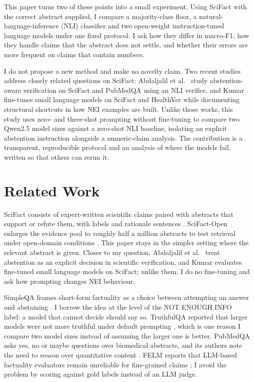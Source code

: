 \documentclass[conference]{IEEEtran}
\begin{document}
This paper turns two of these points into a small experiment. Using SciFact \cite{wadden2020} with the correct abstract supplied, I compare a majority-class floor, a natural-language-inference (NLI) classifier and two open-weight instruction-tuned language models under one fixed protocol. I ask how they differ in macro-F1, how they handle claims that the abstract does not settle, and whether their errors are more frequent on claims that contain numbers.

I do not propose a new method and make no novelty claim. Two recent studies address closely related questions on SciFact: Abdaljalil et al.\ \cite{abdaljalil2026} study abstention-aware verification on SciFact and PubMedQA using an NLI verifier, and Kumar \cite{kumar2026} fine-tunes small language models on SciFact and HealthVer while documenting structural shortcuts in how NEI examples are built. Unlike those works, this study uses zero- and three-shot prompting without fine-tuning to compare two Qwen2.5 model sizes against a zero-shot NLI baseline, isolating an explicit abstention instruction alongside a numeric-claim analysis. The contribution is a transparent, reproducible protocol and an analysis of where the models fail, written so that others can rerun it.

\section{Related Work}
SciFact consists of expert-written scientific claims paired with abstracts that support or refute them, with labels and rationale sentences \cite{wadden2020}. SciFact-Open enlarges the evidence pool to roughly half a million abstracts to test retrieval under open-domain conditions \cite{wadden2022}. This paper stays in the simpler setting where the relevant abstract is given. Closer to my question, Abdaljalil et al.\ \cite{abdaljalil2026} treat abstention as an explicit decision in scientific verification, and Kumar \cite{kumar2026} evaluates fine-tuned small language models on SciFact; unlike them, I do no fine-tuning and ask how prompting changes NEI behaviour.

SimpleQA frames short-form factuality as a choice between attempting an answer and abstaining \cite{wei2024}. I borrow the idea at the level of the NOT ENOUGH INFO label: a model that cannot decide should say so. TruthfulQA reported that larger models were not more truthful under default prompting \cite{lin2022}, which is one reason I compare two model sizes instead of assuming the larger one is better. PubMedQA asks yes, no or maybe questions over biomedical abstracts, and its authors note the need to reason over quantitative content \cite{jin2019}. FELM reports that LLM-based factuality evaluators remain unreliable for fine-grained claims \cite{chen2023}; I avoid the problem by scoring against gold labels instead of an LLM judge.
\end{document}
